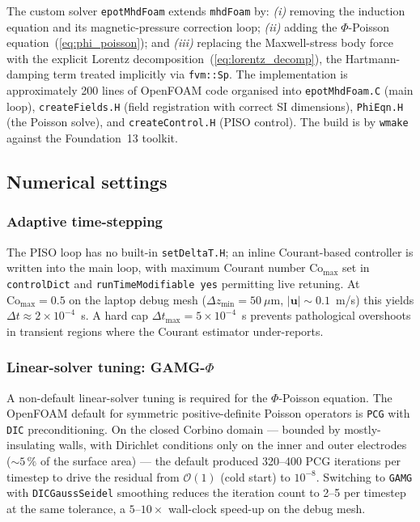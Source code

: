 \documentclass[aps,prl,twocolumn,superscriptaddress]{revtex4-2}
\begin{document}
The custom solver \texttt{epotMhdFoam} extends \texttt{mhdFoam} by:
\textit{(i)} removing the induction equation and its
magnetic-pressure correction loop; \textit{(ii)} adding the
$\Phi$-Poisson equation~(\ref{eq:phi_poisson}); and
\textit{(iii)} replacing the Maxwell-stress body force with the
explicit Lorentz decomposition~(\ref{eq:lorentz_decomp}), the
Hartmann-damping term treated implicitly via \texttt{fvm::Sp}.  The
implementation is approximately 200 lines of OpenFOAM code organised
into \texttt{epotMhdFoam.C} (main loop), \texttt{createFields.H}
(field registration with correct SI dimensions), \texttt{PhiEqn.H}
(the Poisson solve), and \texttt{createControl.H} (PISO control).
The build is by \texttt{wmake} against the Foundation~13 toolkit.

\subsection{Numerical settings}

\subsubsection*{Adaptive time-stepping}
The PISO loop has no built-in \texttt{setDeltaT.H}; an inline
Courant-based controller is written into the main loop, with maximum
Courant number $\mathrm{Co}_{\max}$ set in \texttt{controlDict} and
\texttt{runTimeModifiable yes} permitting live retuning.  At
$\mathrm{Co}_{\max} = 0.5$ on the laptop debug mesh
($\Delta z_{\min} = 50~\mu$m, $|\mathbf{u}|\sim 0.1$~m/s) this yields
$\Delta t \approx 2\!\times\!10^{-4}$~s.  A hard cap
$\Delta t_{\max} = 5\!\times\!10^{-4}$~s prevents pathological
overshoots in transient regions where the Courant estimator
under-reports.

\subsubsection*{Linear-solver tuning: GAMG-$\Phi$}
A non-default linear-solver tuning is required for the $\Phi$-Poisson
equation.  The OpenFOAM default for symmetric positive-definite
Poisson operators is \texttt{PCG} with \texttt{DIC} preconditioning.
On the closed Corbino domain --- bounded by mostly-insulating walls,
with Dirichlet conditions only on the inner and outer electrodes
($\sim 5\,\%$ of the surface area) --- the default produced 320--400
PCG iterations per timestep to drive the residual from $\mathcal{O}(1)$
(cold start) to $10^{-8}$.  Switching to \texttt{GAMG} with
\texttt{DICGaussSeidel} smoothing reduces the iteration count to
2--5 per timestep at the same tolerance, a $5$--$10\!\times\!$
wall-clock speed-up on the debug mesh.
\end{document}

